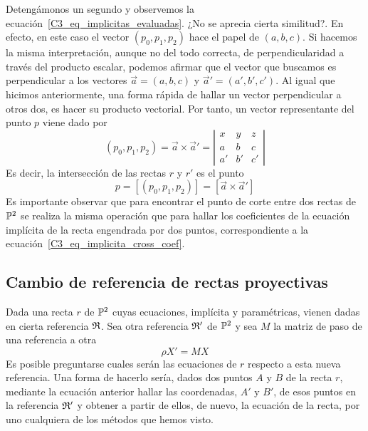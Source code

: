 Detengámonos un segundo y observemos la ecuación~\eqref{C3_eq_implicitas_evaluadas}. ¿No se aprecia cierta similitud?. En efecto, en este caso el vector $(p_0,p_1,p_2)$ hace el papel de $(a,b,c)$. Si hacemos la misma interpretación, aunque no del todo correcta, de perpendicularidad a través del producto escalar, podemos afirmar que el vector que buscamos es perpendicular a los vectores $\vec{a}=(a,b,c)$ y $\vec{a}'=(a',b',c')$. Al igual que hicimos anteriormente, una forma rápida de hallar un vector perpendicular a otros dos, es hacer su producto vectorial. Por tanto, un vector representante del punto $p$ viene dado por
\begin{equation*}
	(p_0,p_1,p_2)=\vec{a}\times \vec{a}'=\left| \begin{array}{ccc}
		x & y & z\\
		a & b & c\\
		a' & b' & c'
	\end{array}\right| 
\end{equation*}
Es decir, la intersección de las rectas $r$ y $r'$ es el punto 
\begin{equation}
	p=[(p_0,p_1,p_2)]=[\vec{a}\times \vec{a}']
\end{equation}
Es importante observar que para encontrar el punto de corte entre dos rectas de $\mathbb{P}^2$ se realiza la misma operación que para hallar los coeficientes de la ecuación implícita de la recta engendrada por dos puntos, correspondiente a la ecuación~\eqref{C3_eq_implicita_cross_coef}. 

\subsection{Cambio de referencia de rectas proyectivas}
Dada una recta $r$ de $\mathbb{P}^2$ cuyas ecuaciones, implícita y paramétricas, vienen dadas en cierta referencia $\mathfrak{R}$. Sea otra referencia $\mathfrak{R}'$ de $\mathbb{P}^2$ y sea $M$ la matriz de paso de una referencia a otra
\begin{equation*}
	\rho X'=MX
\end{equation*}
Es posible preguntarse cuales serán las ecuaciones de $r$ respecto a esta nueva referencia. Una forma de hacerlo sería, dados dos puntos $A$ y $B$ de la recta $r$, mediante la ecuación anterior hallar las coordenadas, $A'$ y $B'$, de esos puntos en la referencia $\mathfrak{R}'$ y obtener a partir de ellos, de nuevo, la ecuación de la recta, por uno cualquiera de los métodos que hemos visto.\\

